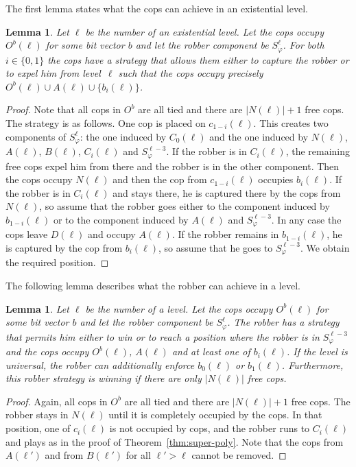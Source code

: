 \documentclass[authoryear]{article}
\newtheorem{lemma}[theorem]{Lemma}
\theoremstyle{definition}
\renewcommand{\phi}{\varphi}
\newcommand{\0}{\emptyset}
\begin{document}
The first lemma states what the cops can achieve in an existential level.

\begin{lemma}\label{lemma:cops_invariant}
  Let $\ell$ be the number of an existential level.  Let the cops occupy
  $O^b(\ell)$ for some bit vector $b$ and let the robber component be
  $S^{\ell}_\phi$.  For both $i\in\{0,1\}$ the cops have a strategy that allows
  them either to capture the robber or to expel him from level~$\ell$ such that
  the cops occupy precisely $O^b(\ell)\cup A(\ell) \cup \{b_i(\ell)\}$.
\end{lemma}
\begin{proof}
  Note that all cops in $O^b$ are all tied and there are $|N(\ell)|+1$ free
  cops.  The strategy is as follows. One cop is placed on $c_{1-i}(\ell)$. This
  creates two components of $S_\phi^\ell$: the one induced by $C_0(\ell)$ and
  the one induced by $N(\ell)$, $A(\ell)$, $B(\ell)$, $C_i(\ell)$ and
  $S_\phi^{\ell-3}$. If the robber is in $C_i(\ell)$, the remaining free cops
  expel him from there and the robber is in the other component. Then the cops
  occupy $N(\ell)$ and then the cop from $c_{1-i}(\ell)$ occupies
  $b_i(\ell)$. If the robber is in $C_i(\ell)$ and stays there, he is captured
  there by the cops from $N(\ell)$, so assume that the robber goes either to the
  component induced by $b_{1-i}(\ell)$ or to the component induced by $A(\ell)$
  and $S_\phi^{\ell-3}$. In any case the cops leave $D(\ell)$ and occupy
  $A(\ell)$. If the robber remains in $b_{1-i}(\ell)$, he is captured by the cop
  from $b_i(\ell)$, so assume that he goes to $S_\phi^{\ell-3}$. We obtain the
  required position.
\end{proof}

The following lemma describes what the robber can achieve in a level.

\begin{lemma}\label{lemma:robber_invariant}
  Let $\ell$ be the number of a level.  Let the cops occupy
  $O^b(\ell)$ for some bit vector $b$ and let the robber component be
  $S^{\ell}_\phi$. The robber has a strategy that permits him either to win or
  to reach a position where the robber is in $S_\phi^{\ell-3}$ and the cops
  occupy $O^b(\ell)$, $A(\ell)$ and at least one of $b_i(\ell)$. If the level is
  universal, the robber can additionally enforce $b_0(\ell)$ or $b_1(\ell)$. Furthermore,
  this robber strategy is winning if there are only $|N(\ell)|$ free cops.
\end{lemma}
\begin{proof}
  Again, all cops in $O^b$ are all tied and there are $|N(\ell)|+1$ free cops.
  The robber stays in $N(\ell)$ until it is completely occupied by the cops. In
  that position, one of $c_i(\ell)$ is not occupied by cops, and the robber runs
  to $C_i(\ell)$ and plays as in the proof of
  Theorem~\ref{thm:super-poly}. Note that the cops from $A(\ell')$ and from
  $B(\ell')$ for all $\ell'>\ell$ cannot be removed.
\end{proof}
\end{document}
